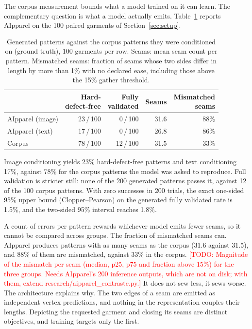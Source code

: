 \documentclass[10pt,twocolumn]{article}
\newcommand{\todo}[1]{\textcolor{red}{[TODO: #1]}}
\begin{document}
The corpus measurement bounds what a model trained on it can learn. The
complementary question is what a model actually emits. Table~\ref{tab:generated}
reports AIpparel on the 100 paired garments of Section~\ref{sec:setup}.

\begin{table}[t]
\centering
\small
\setlength{\tabcolsep}{3pt}
\begin{tabular}{@{}lrrrr@{}}
\toprule
& \shortstack[r]{Hard-\\defect-free} & \shortstack[r]{Fully\\validated}
& Seams & \shortstack[r]{Mismatched\\seams} \\
\midrule
AIpparel (image) & 23\,/\,100 & 0\,/\,100 & 31.6 & 88\% \\
AIpparel (text)  & 17\,/\,100 & 0\,/\,100 & 26.8 & 86\% \\
Corpus & 78\,/\,100 & 12\,/\,100 & 31.5 & 33\% \\
\bottomrule
\end{tabular}
\caption{Generated patterns against the corpus patterns they were conditioned
on (ground truth), 100 garments per row.
 Seams: mean seam count per pattern. Mismatched
seams: fraction of seams whose two sides differ in length by more than 1\%
with no declared ease, including those above the 15\% gather threshold.}
\label{tab:generated}
\end{table}

Image conditioning yields 23\% hard-defect-free patterns and text
conditioning 17\%, against 78\% for the corpus patterns the model was asked to
reproduce. Full validation is stricter still: none of the 200 generated
patterns passes it, against 12 of the 100 corpus patterns. With zero successes
in 200 trials, the exact one-sided 95\% upper bound (Clopper--Pearson) on the
generated fully validated rate is 1.5\%, and the two-sided 95\% interval
reaches 1.8\%.

A count of errors per pattern rewards whichever model emits fewer seams, so it
cannot be compared across groups. The fraction of mismatched seams can.
AIpparel produces patterns with as many seams as the corpus (31.6 against
31.5), and 88\% of them are mismatched, against 33\% in the corpus.
\todo{Magnitude of the mismatch per seam (median, p25, p75 and fraction above
15\%) for the three groups. Needs AIpparel's 200 inference outputs, which are
not on disk; with them, extend research/aipparel\_contraste.py.}
It does not sew less, it sews worse. The architecture explains why. The two
edges of a seam are emitted as independent vertex predictions, and nothing in
the representation couples their lengths. Depicting the requested garment and
closing its seams are distinct objectives, and training targets only the
first.
\end{document}
